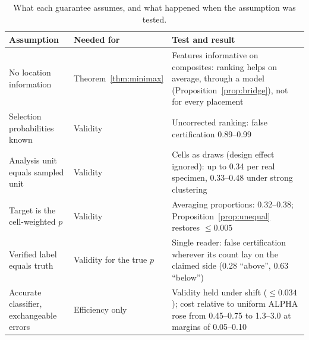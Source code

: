 \documentclass[preprint,12pt]{elsarticle}
\theoremstyle{remark}
\theoremstyle{definition}
\begin{document}
\begin{table}[!htbp]
\centering\small
\caption{What each guarantee assumes, and what happened when the assumption was tested.}\label{tab:assump}
\begin{tabular}{@{}L{4.2cm}L{2.6cm}L{7.4cm}@{}}
\toprule
Assumption & Needed for & Test and result\\
\midrule
No location information & Theorem~\ref{thm:minimax} & Features informative on composites: ranking helps on average, through a model (Proposition~\ref{prop:bridge}), not for every placement\\
Selection probabilities known & Validity & Uncorrected ranking: false certification 0.89--0.99\\
Analysis unit equals sampled unit & Validity & Cells as draws (design effect ignored): up to 0.34 per real specimen, 0.33--0.48 under strong clustering\\
Target is the cell-weighted $p$ & Validity & Averaging proportions: 0.32--0.38; Proposition~\ref{prop:unequal} restores $\le0.005$\\
Verified label equals truth & Validity for the true $p$ & Single reader: false certification wherever its count lay on the claimed side (0.28 ``above'', 0.63 ``below'')\\
Accurate classifier, exchangeable errors & Efficiency only & Validity held under shift ($\le0.034$); cost relative to uniform ALPHA rose from 0.45--0.75 to 1.3--3.0 at margins of 0.05--0.10\\
\bottomrule
\end{tabular}
\end{table}
\end{document}
